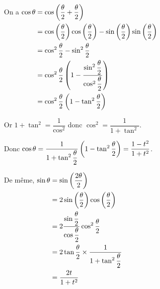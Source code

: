 \begin{itemize}
On a \(\begin{aligned}[t]
\cos\theta&=\cos\left(\dfrac{\theta}{2}+\dfrac{\theta}{2}\right) \\
&=\cos\left(\dfrac{\theta}{2}\right)\cos\left(\dfrac{\theta}{2}\right)-\sin\left(\dfrac{\theta}{2}\right)\sin\left(\dfrac{\theta}{2}\right) \\
&=\cos^2\dfrac{\theta}{2}-\sin^2\dfrac{\theta}{2} \\
&=\cos^2\dfrac{\theta}{2}\left(1-\dfrac{\sin^2\dfrac{\theta}{2}}{\cos^2\dfrac{\theta}{2}}\right) \\
&=\cos^2\dfrac{\theta}{2}\left(1-\tan^2\dfrac{\theta}{2}\right)
\end{aligned}\)

Or \(1+\tan^2=\dfrac{1}{\cos^2}\) donc \(\cos^2=\dfrac{1}{1+\tan^2}\).

Donc \(\cos\theta=\dfrac{1}{1+\tan^2\dfrac{\theta}{2}}\left(1-\tan^2\dfrac{\theta}{2}\right)=\dfrac{1-t^2}{1+t^2}\).

De même, \(\begin{aligned}[t]
\sin\theta&=\sin\left(\dfrac{2\theta}{2}\right) \\
&=2\sin\left(\dfrac{\theta}{2}\right)\cos\left(\dfrac{\theta}{2}\right) \\
&=2\dfrac{\sin\dfrac{\theta}{2}}{\cos\dfrac{\theta}{2}}\cos^2\dfrac{\theta}{2} \\
&=2\tan\dfrac{\theta}{2}\times\dfrac{1}{1+\tan^2\dfrac{\theta}{2}} \\
&=\dfrac{2t}{1+t^2}
\end{aligned}\)
\end{itemize}

